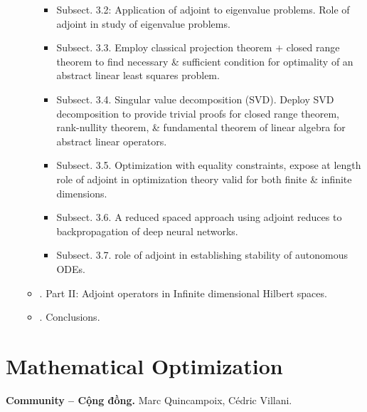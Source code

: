 \documentclass{article}
\begin{document}
\begin{enumerate}
\begin{itemize}
\begin{itemize}
			\item {\sf Subsect. 3.2: Application of adjoint to eigenvalue problems.} Role of adjoint in study of eigenvalue problems.
			
			\item {\sf Subsect. 3.3.} Employ classical projection theorem $+$ closed range theorem to find necessary \& sufficient condition for optimality of an abstract linear least squares problem.
			
			\item {\sf Subsect. 3.4.} Singular value decomposition (SVD). Deploy SVD decomposition to provide trivial proofs for closed range theorem, rank-nullity theorem, \& fundamental theorem of linear algebra for abstract linear operators.
			
			\item {\sf Subsect. 3.5.} Optimization with equality constraints, expose at length role of adjoint in optimization theory valid for both finite \& infinite dimensions.
			
			\item {\sf Subsect. 3.6.} A reduced spaced approach using adjoint reduces to backpropagation of deep neural networks.
			
			\item {\sf Subsect. 3.7.} role of adjoint in establishing stability of autonomous ODEs.
		\end{itemize}
		\item {. Part II: Adjoint operators in Infinite dimensional Hilbert spaces.}
		\item {. Conclusions.}
	\end{itemize}
\end{enumerate}


\section{Mathematical Optimization}
\textbf{\textsf{Community -- Cộng đồng.}} {\sc Marc Quincampoix, C\'{e}dric Villani}.
\end{document}
